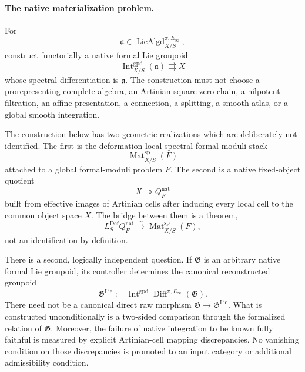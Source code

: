 \paragraph{The native materialization problem.}
For
\[
    \mathfrak a\in
    \operatorname{LieAlgd}^{\pi,E_\infty}_{X/S},
\]
construct functorially a native formal Lie groupoid
\[
    \operatorname{Int}^{\mathrm{gpd}}_{X/S}(\mathfrak a)
    \rightrightarrows X
\]
whose spectral differentiation is $\mathfrak a$.  The construction must not
choose a prorepresenting complete algebra, an Artinian square-zero chain, a
nilpotent filtration, an affine presentation, a connection, a splitting, a
smooth atlas, or a global smooth integration.

The construction below has two geometric realizations which are deliberately
not identified.  The first is the deformation-local spectral formal-moduli
stack
\[
    \operatorname{Mat}^{\mathrm{sp}}_{X/S}(F)
\]
attached to a global formal-moduli problem $F$.  The second is a native
fixed-object quotient
\[
    X\twoheadrightarrow Q_F^{\mathrm{nat}}
\]
built from effective images of Artinian cells after inducing every local cell
to the common object space $X$.  The bridge between them is a theorem,
\[
    L_S^{\mathrm{Def}}Q_F^{\mathrm{nat}}
    \xrightarrow{\sim}
    \operatorname{Mat}^{\mathrm{sp}}_{X/S}(F),
\]
not an identification by definition.

There is a second, logically independent question.  If $\mathfrak G$ is an
arbitrary native formal Lie groupoid, its controller determines the canonical
reconstructed groupoid
\[
    \mathfrak G^{\mathrm{Lie}}
    :=
    \operatorname{Int}^{\mathrm{gpd}}
    \operatorname{Diff}^{\pi,E_\infty}(\mathfrak G).
\]
There need not be a canonical direct raw morphism
$\mathfrak G\to\mathfrak G^{\mathrm{Lie}}$.  What is constructed
unconditionally is a two-sided comparison through the formalized relation of
$\mathfrak G$.  Moreover, the failure of native integration to be known fully
faithful is measured by explicit Artinian-cell mapping discrepancies.  No
vanishing condition on those discrepancies is promoted to an input category
or additional admissibility condition.

